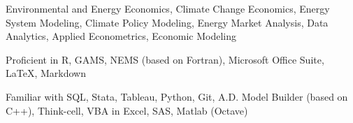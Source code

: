 


\begin{pubitems} %
    \item {Environmental and Energy Economics, Climate Change Economics, Energy System Modeling, Climate Policy Modeling, Energy Market Analysis, Data Analytics, Applied Econometrics, Economic Modeling}
\end{pubitems}



\begin{pubitems} %
    \item {Proficient in R, GAMS, NEMS (based on Fortran), Microsoft Office Suite, \LaTeX, Markdown}
    \item {Familiar with SQL, Stata, Tableau, Python, Git, A.D. Model Builder (based on C++), Think-cell, VBA in Excel, SAS, Matlab (Octave)}
\end{pubitems}






